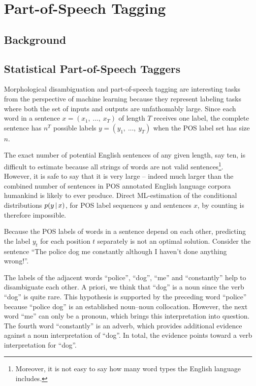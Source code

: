 \chapter{Part-of-Speech Tagging}

\section{Background}
\section{Statistical Part-of-Speech Taggers}

Morphological disambiguation and part-of-speech tagging are
interesting tasks from the perspective of machine learning because
they represent labeling tasks where both the set of inputs and outputs
are unfathomably large. Since each word in a sentence $x = (x_1,\
...,\ x_T)$ of length $T$ receives one label, the complete sentence
has $n^T$ possible labels $y = (y_1,\ ...,\ y_T)$ when the POS label
set has size $n$.

The exact number of potential English sentences of any given length,
say ten, is difficult to estimate because all strings of words are not
valid sentences\footnote{Moreover, it is not easy to say how many word
  types the English language includes.}. However, it is safe to say
that it is very large -- indeed much larger than the combined number
of sentences in POS annotated English language corpora humankind is
likely to ever produce. Direct ML-estimation of the conditional
distributions $p(y\mbox{$ \, | \, $} x)$, for POS label sequences $y$ and sentences
$x$, by counting is therefore impossible.

Because the POS labels of words in a sentence depend on each other,
predicting the label $y_t$ for each position $t$ separately is not an
optimal solution. Consider the sentence ``The police dog me constantly
although I haven't done anything wrong!''. 

The labels of the adjacent words ``police'', ``dog'', ``me'' and
``constantly'' help to disambiguate each other. A priori, we think
that ``dog'' is a noun since the verb ``dog'' is quite rare. This
hypothesis is supported by the preceding word ``police'' because
``police dog'' is an established noun--noun collocation. However, the
next word ``me'' can only be a pronoun, which brings this
interpretation into question. The fourth word ``constantly'' is an
adverb, which provides additional evidence against a noun
interpretation of ``dog''. In total, the evidence points toward a verb
interpretation for ``dog''.

